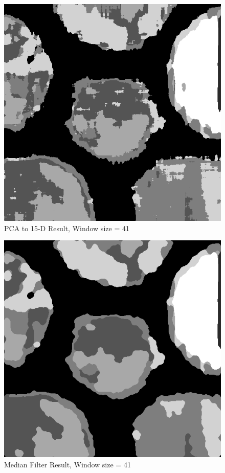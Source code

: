 \documentclass[11pt]{article}
\begin{document}
\begin{figure}[!htp]
	\centering
	\includegraphics[scale=0.4]{texture_seg_pca_15.png}
	\caption{PCA to 15-D Result, Window size = 41}
	\label{texture_seg_pca_15}
	\end{figure}
	
	
	
\begin{figure}[!htp]
	\centering
	\includegraphics[scale=0.4]{enhance_seg_medfilt2.png}
	\caption{Median Filter Result, Window size = 41}
	\label{enhance_seg_medfilt2}
	\end{figure}
\end{document}
